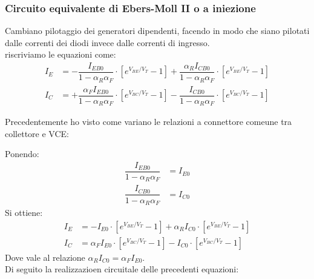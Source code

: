 \subsubsection{Circuito equivalente di Ebers-Moll II o a iniezione}
Cambiano pilotaggio dei generatori dipendenti, facendo in modo che siano pilotati dalle correnti dei diodi invece dalle correnti di ingresso.\\
riscriviamo le equazioni come:
\begin{align}
    I_E &= -\dfrac{I_{EB0}}{1-\alpha_R \alpha_F}  \cdot \left[ e^{V_{BE}/V_T} -1 \right] 
        +\dfrac{\alpha_R I_{CB0}}{1-\alpha_R \alpha_F} \cdot \left[ e^{V_{BE}/V_T} -1 \right]\\
    I_C &= +\dfrac{\alpha_F I_{EB0}}{1-\alpha_R \alpha_F} \cdot \left[ e^{V_{BC}/V_T} -1 \right]
        -\dfrac{I_{CB0}}{1-\alpha_R \alpha_F}  \cdot \left[ e^{V_{BC}/V_T} -1 \right] 
\end{align}
%
\begin{exbox}
    Precedentemente ho visto come variano le relazioni a connettore comeune tra collettore e VCE:
\end{exbox}
%
Ponendo:
\begin{align}
    \dfrac{I_{EB0}}{1-\alpha_R \alpha_F}  &= I_{E0}\\
    \dfrac{I_{CB0}}{1-\alpha_R \alpha_F}  &= I_{C0}
\end{align}
Si ottiene:
\begin{align}
    I_E &= - I_{E0}  \cdot \left[ e^{V_{BE}/V_T} -1 \right] +\alpha_R I_{C0} \cdot \left[ e^{V_{BE}/V_T} -1 \right]\\
    I_C &=  \alpha_F I_{E0} \cdot \left[ e^{V_{BC}/V_T} -1 \right] -I_{C0}  \cdot \left[ e^{V_{BC}/V_T} -1 \right] 
\end{align}
Dove vale al relazione $\alpha_R I_{C0}=\alpha_F I_{E0}$.\\
Di seguito la realizzazioen circuitale delle precedenti equazioni:
%

